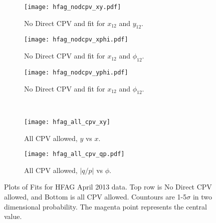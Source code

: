 \begin{figure}[htb]
  \begin{center}
    \begin{subfigure}[b]{0.3\textwidth}
      \centering
      \texttt{[image: hfag\_nodcpv\_xy.pdf]}
      \caption{No Direct CPV and fit for $x_{12}$ and $y_{12}$.}
      \label{fig:nodcpv_xy}
    \end{subfigure}
    \begin{subfigure}[b]{0.3\textwidth}
      \centering
      \texttt{[image: hfag\_nodcpv\_xphi.pdf]}
      \caption{No Direct CPV and fit for $x_{12}$ and $\phi_{12}$.}
      \label{fig:nodcpv_xphi}
    \end{subfigure}%
    \begin{subfigure}[b]{0.3\textwidth}
      \centering
      \texttt{[image: hfag\_nodcpv\_yphi.pdf]}
      \caption{No Direct CPV and fit for $x_{12}$ and $\phi_{12}$.}
      \label{fig:nodcpv_xphi}
    \end{subfigure}%
    \\
    \begin{subfigure}[b]{0.4\textwidth}
      \centering
      \texttt{[image: hfag\_all\_cpv\_xy]}
      \caption{All CPV allowed, $y$ vs $x$.}
      \label{fig:xy_all_hfag}
    \end{subfigure}\hspace{3mm}%
    \begin{subfigure}[b]{0.4\textwidth}
      \centering
      \texttt{[image: hfag\_all\_cpv\_qp.pdf]}
      \caption{All CPV allowed, $|q/p|$ vs $\phi$.}
      \label{fig:qp_all_hfag}
    \end{subfigure}%
    \hspace{3mm}
  \end{center}
  \caption{Plots of Fits for HFAG April 2013 data. Top row is No Direct CPV allowed, and Bottom is all CPV allowed. Countours are 1-5$\sigma$ in two dimensional
  probability. The magenta point represents the central value.}
  \label{fig:hfag_fit_2013}
\end{figure}



